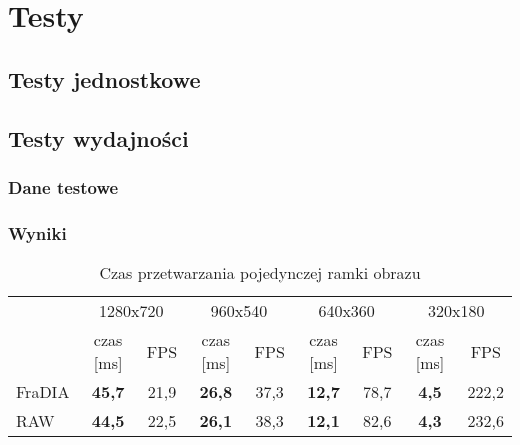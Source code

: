 \documentclass[a4paper,12pt]{article}
\begin{document}
\section{Testy}

\subsection{Testy jednostkowe}

\subsection{Testy wydajności}

\subsubsection{Dane testowe}
\subsubsection{Wyniki}







\begin{table}[h!]
\caption[Zadanie pierwsze -- czas przetwarzania pojedynczej ramki obrazu]{Czas przetwarzania pojedynczej ramki obrazu}
\centering
\begin{tabular}{lcccccccc}
\toprule
 & \multicolumn{2}{c}{1280x720} & \multicolumn{2}{c}{960x540} & \multicolumn{2}{c}{640x360} & \multicolumn{2}{c}{320x180} \\
\cmidrule(r){2-9}
 & czas [ms] & FPS & czas [ms] & FPS & czas [ms] & FPS & czas [ms] & FPS \\
\midrule
FraDIA & \bf 45,7 & 21,9 & \bf 26,8 & 37,3 & \bf 12,7 & 78,7 & \bf 4,5 & 222,2 \\
RAW    & \bf 44,5 & 22,5 & \bf 26,1 & 38,3 & \bf 12,1 & 82,6 & \bf 4,3 & 232,6 \\
\bottomrule
\end{tabular}
\label{tab:zad_1_wyniki}
\end{table}
\end{document}
